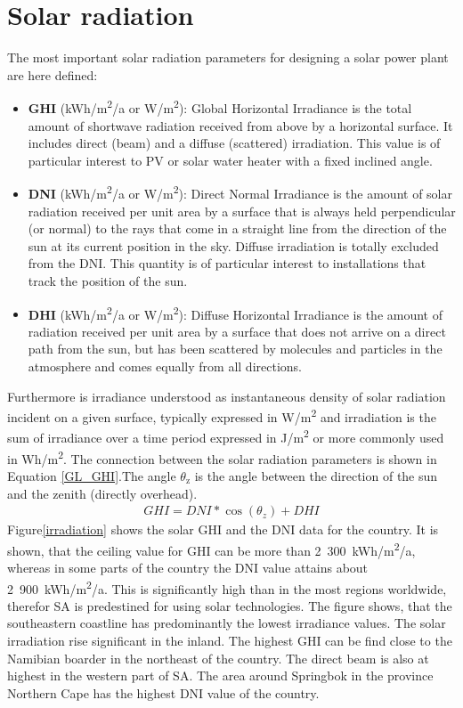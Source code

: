 \section{Solar radiation}
The most important solar radiation parameters for designing a solar power plant are here defined:
\begin{itemize}
\item \textbf{GHI} (kWh/m\textsuperscript{2}/a or W/m\textsuperscript{2}): Global Horizontal Irradiance is the total amount of shortwave radiation received from above by a horizontal surface. It includes direct (beam) and a diffuse (scattered) irradiation. This value is of particular interest to PV or solar water heater with a fixed inclined angle.
\item \textbf{DNI} (kWh/m\textsuperscript{2}/a or W/m\textsuperscript{2}): Direct Normal Irradiance is the amount of solar radiation received per unit area by a surface that is always held perpendicular (or normal) to the rays that come in a straight line from the direction of the sun at its current position in the sky. Diffuse irradiation is totally excluded from the DNI. This quantity is of particular interest to  installations that track the position of the sun.
\item \textbf{DHI} (kWh/m\textsuperscript{2}/a or W/m\textsuperscript{2}): Diffuse Horizontal Irradiance is the amount of radiation received per unit area by a surface that does not arrive on a direct path from the sun, but has been scattered by molecules and particles in the atmosphere and comes equally from all directions.
\end{itemize}
Furthermore is irradiance understood as instantaneous density of solar radiation incident on a given surface, typically expressed in W/m\textsuperscript{2} and irradiation is the sum of irradiance over a time period expressed in J/m\textsuperscript{2} or more commonly used in Wh/m\textsuperscript{2}. The connection between the solar radiation parameters is shown in Equation \ref{GL_GHI}.The angle $\theta_\text{z}$ is the angle between the direction of the sun and the zenith (directly overhead).
\begin{align}
GHI=DNI*\cos(\theta_{z})+DHI \label{GL_GHI}
\end{align}
Figure\ref{irradiation} shows the solar GHI and the DNI data for the country. It is shown, that the ceiling value for GHI can be more than 2~300~kWh/m\textsuperscript{2}/a, whereas in some parts of the country the DNI  value attains about 2~900~kWh/m\textsuperscript{2}/a. This is significantly high than in the most regions worldwide, therefor SA is predestined for using solar technologies. The figure shows, that the southeastern coastline has predominantly the lowest irradiance values. The solar irradiation rise significant in the inland. The highest GHI can be find close to the Namibian boarder in the northeast of the country. The direct beam is also at highest in the western part of SA. The area around Springbok in the province Northern Cape has the highest DNI value of the country.
